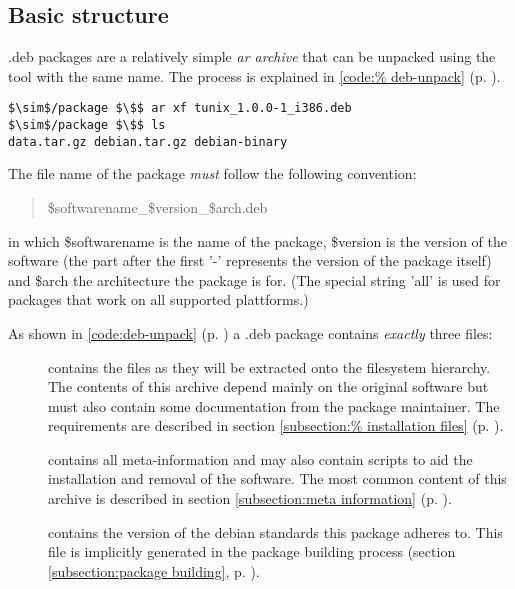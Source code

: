 \subsection{Basic structure}
.deb packages are a relatively simple \emph{ar archive} that can be unpacked using the
tool with the same name. The process is explained in \lstlistingname{} \ref{code:%
deb-unpack} (p. \pageref{code:deb-unpack}).
\begin{lstlisting}[label={code:deb-unpack},caption={Unpacking a .deb package using
ar},float=ht]
$\sim$/package $\$$ ar xf tunix_1.0.0-1_i386.deb
$\sim$/package $\$$ ls
data.tar.gz debian.tar.gz debian-binary
\end{lstlisting}

The file name of the package \emph{must} follow the following convention:
\begin{quote}
    \$softwarename\_\$version\_\$arch.deb
\end{quote}
in which \$softwarename is the name of the package, \$version is the version of
the software (the part after the first '-' represents the version of the
package itself) and \$arch the architecture the package is for. (The special
string 'all' is used for packages that work on all supported plattforms.)

As shown in \lstlistingname{} \ref{code:deb-unpack} (p. \pageref{code:%
deb-unpack}) a .deb package contains \emph{exactly} three files:
\begin{description}
  \item[] contains the files as they will be extracted onto the
    filesystem hierarchy. The contents of this archive depend mainly on the
    original software but must also contain some documentation from the package
    maintainer. The requirements are described in section \ref{subsection:%
    installation files} (p. \pageref{subsection:installation files}).
  \item[] contains all meta-information and may also contain
    scripts to aid the installation and removal of the software. The most common
    content of this archive is described in section \ref{subsection:meta
    information} (p. \pageref{subsection:meta information}).
  \item[] contains the version of the debian standards this
    package adheres to. This file is implicitly generated in the package building
    process (section \ref{subsection:package building}, p. \pageref{subsection:%
    package building}).
\end{description}

